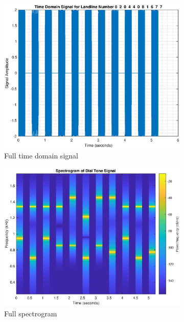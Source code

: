 \documentclass{article}
\begin{document}
\begin{figure}[h!]
\centering
\begin{subfigure}{0.32\textwidth}
\centering
\includegraphics[width = \textwidth]{dtp_fullsig}
\caption{Full time domain signal}
\label{fig:dtp_fullsig}
\end{subfigure}
\begin{subfigure}{0.32\textwidth}
\centering
\includegraphics[width = \textwidth]{dtp_spectrogram}
\caption{Full spectrogram}
\label{fig:dtp_spectrogram}
\end{subfigure}
\begin{subfigure}{0.32\textwidth}

\end{subfigure}
\end{figure}
\end{document}
